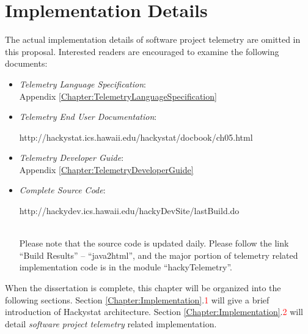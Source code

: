 \section{Implementation Details}

The actual implementation details of software project telemetry are omitted in this proposal. Interested readers are encouraged to examine the following documents:
\begin{itemize}
	\item \textit{Telemetry Language Specification}:\\
	Appendix \ref{Chapter:TelemetryLanguageSpecification}
	
	\item \textit{Telemetry End User Documentation}:\\
	http://hackystat.ics.hawaii.edu/hackystat/docbook/ch05.html 
		
	\item \textit{Telemetry Developer Guide}:\\
	Appendix \ref{Chapter:TelemetryDeveloperGuide}

	\item \textit{Complete Source Code}:\\
	http://hackydev.ics.hawaii.edu/hackyDevSite/lastBuild.do
	\\
	Please note that the source code is updated daily. Please follow the link ``Build Results'' -- ``java2html'', and the major portion of telemetry related implementation code is in the module ``hackyTelemetry''.
\end{itemize}


When the dissertation is complete, this chapter will be organized into the following sections. Section \ref{Chapter:Implementation}.\textcolor{red}{1} will give a brief introduction of Hackystat architecture. Section \ref{Chapter:Implementation}.\textcolor{red}{2} will detail \textit{software project telemetry} related implementation.




